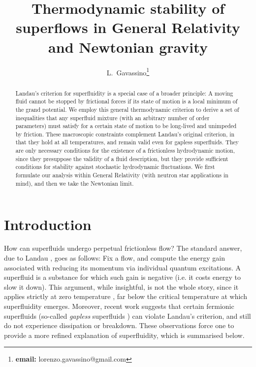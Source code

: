 \documentclass[a4paper, amsfonts, amssymb, amsmath, reprint, showkeys, nofootinbib, twoside,notitlepage,onecolumn]{revtex4-2}
\theoremstyle{definition}
\theoremstyle{theorem}
\theoremstyle{corollary}
\begin{document}
\title{Thermodynamic stability of superflows in General Relativity and Newtonian gravity}
\author{ L.~Gavassino\footnote{\textbf{email:} lorenzo.gavassino@gmail.com}}


\begin{abstract}
Landau's criterion for superfluidity is a special case of a broader principle: A moving fluid cannot be stopped by frictional forces if its state of motion is a local minimum of the grand potential. We employ this general thermodynamic criterion to derive a set of inequalities that any superfluid mixture (with an arbitrary number of order parameters) must satisfy for a certain state of motion to be long-lived and unimpeded by friction. These macroscopic constraints complement Landau's original criterion, in that they hold at all temperatures, and remain valid even for gapless superfluids. They are only necessary conditions for the existence of a frictionless hydrodynamic motion, since they presuppose the validity of a fluid description, but they provide sufficient conditions for stability against stochastic hydrodynamic fluctuations. We first formulate our analysis within General Relativity (with neutron star applications in mind), and then we take the Newtonian limit.
\end{abstract} 

\maketitle

\section{Introduction}
\vspace{-0.4cm}

How can superfluids undergo perpetual frictionless flow? The standard answer, due to Landau \cite[\S 22]{landau9}, goes as follows: Fix a flow, and compute the energy gain associated with reducing its momentum via individual quantum excitations. A superfluid is a substance for which such gain is negative (i.e. it costs energy to slow it down). This argument, while insightful, is not the whole story, since it applies strictly at zero temperature \cite[\S 13.4]{huang_book}, far below the critical temperature at which superfluidity emerges. Moreover, recent work suggests that certain fermionic superfluids (so-called \textit{gapless} superfluids \cite{AllardChamel2023PartI,AllardChamel2023PartII,AllardChamel2024EPJA,AllardChamel2024PRL,AllardChamel2025}) can violate Landau's criterion, and still do not experience dissipation or breakdown. These observations force one to provide a more refined explanation of superfluidity, which is summarised below. 
\end{document}
